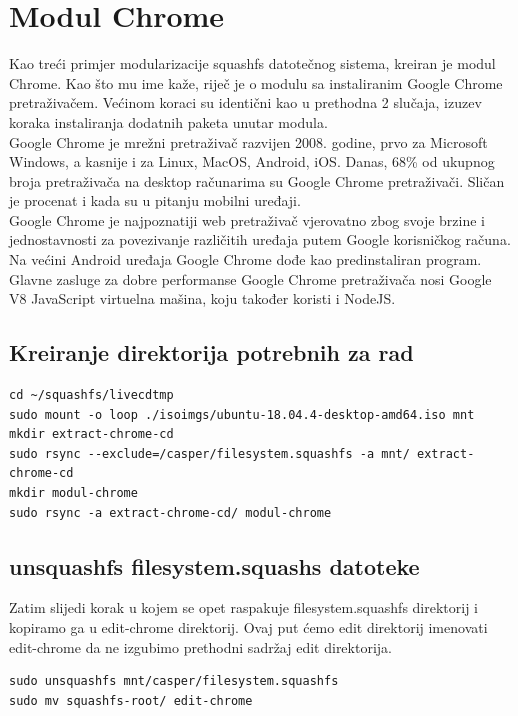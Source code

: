 \documentclass[12pt,vi]{mitthesis}
\begin{document}
\section*{Modul Chrome}
\indent
Kao treći primjer modularizacije squashfs datotečnog sistema, kreiran je modul Chrome. Kao što mu ime kaže, riječ je o modulu sa instaliranim Google Chrome pretraživačem. Većinom koraci su identični kao u prethodna 2 slučaja, izuzev koraka instaliranja dodatnih paketa unutar modula.\\
\indent
Google Chrome je mrežni pretraživač razvijen 2008. godine, prvo za Microsoft Windows, a kasnije i za Linux, MacOS, Android, iOS. Danas, 68\% od ukupnog broja pretraživača na desktop računarima su Google Chrome pretraživači. Sličan je procenat i kada su u pitanju mobilni uređaji.\\
\indent
Google Chrome je najpoznatiji web pretraživač vjerovatno zbog svoje brzine i jednostavnosti za povezivanje različitih uređaja putem Google korisničkog računa. Na većini Android uređaja Google Chrome dođe kao predinstaliran program. Glavne zasluge za dobre performanse Google Chrome pretraživača nosi Google V8 JavaScript virtuelna mašina, koju također koristi i NodeJS.
\subsection*{Kreiranje direktorija potrebnih za rad}
\begin{lstlisting}[style=BashInputStyle]
cd ~/squashfs/livecdtmp
sudo mount -o loop ./isoimgs/ubuntu-18.04.4-desktop-amd64.iso mnt
mkdir extract-chrome-cd
sudo rsync --exclude=/casper/filesystem.squashfs -a mnt/ extract-chrome-cd
mkdir modul-chrome
sudo rsync -a extract-chrome-cd/ modul-chrome
\end{lstlisting}

\subsection*{unsquashfs filesystem.squashs datoteke}
\indent
Zatim slijedi korak u kojem se opet raspakuje filesystem.squashfs direktorij i kopiramo ga u edit-chrome direktorij. Ovaj put ćemo edit direktorij imenovati edit-chrome da ne izgubimo prethodni sadržaj edit direktorija.\\
\begin{lstlisting}[style=BashInputStyle]
sudo unsquashfs mnt/casper/filesystem.squashfs
sudo mv squashfs-root/ edit-chrome
\end{lstlisting}
\end{document}
